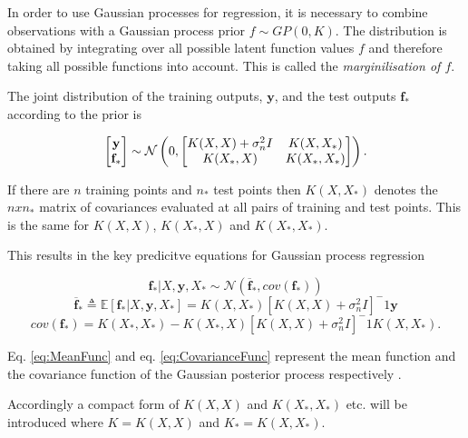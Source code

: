 \documentclass[12pt,a4paper]{report}
\theoremstyle{definition}
\begin{document}
In order to use Gaussian processes for regression, it is necessary to combine observations with a Gaussian process prior $f \sim GP(0, K)$. 
The distribution is obtained by integrating over all possible latent function values $f$ and therefore taking all possible functions into account. This is called the \emph{marginilisation of $f$}. 

The joint distribution of the training outputs, $\textbf{y}$, and the test outputs $\textbf{f}_{*}$ according to the prior is 

\begin{equation}
	\centering
	\begin{bmatrix}
		\textbf{y} \\
		\textbf{f}_{*}
	\end{bmatrix}
	\sim \mathcal{N} \left( 0,
	\begin{bmatrix}
		K(X, X) + \sigma_{n}^2I & K(X, X_{*}) \\
		K(X_{*},  X) & K(X_{*},  X_{*})
	\end{bmatrix} \right) .
	\label{eq:JointPriorDist}
\end{equation}

If there are $n$ training points and $n_{*}$ test points then $K(X, X_{*})$ denotes the $n x n_{*}$ matrix of covariances evaluated at all pairs of training and test points. 
This is the same for $K(X, X)$, $K(X_{*},  X)$ and $K(X_{*},  X_{*})$.

This results in the key predicitve equations for Gaussian process regression

\begin{equation}
	\textbf{f}_{*} | X, \textbf{y}, X_{*} \sim \mathcal{N}(\overline{\textbf{f}}_{*}, cov(\textbf{f}_{*}))
\end{equation}
\begin{equation}
	\overline{\textbf{f}}_{*} \triangleq \mathbb{E}[\textbf{f}_{*} | X, \textbf{y}, X_{*}] = K(X, X_{*})[K(X, X) +  \sigma_{n}^2I]^-1 \textbf{y}
	\label{eq:MeanFunc}
\end{equation}
\begin{equation}
	cov(\textbf{f}_{*}) = K(X_{*}, X_{*}) - K(X_{*}, X)[K(X, X) +  \sigma_{n}^2I]^-1 K(X, X_{*}).
	\label{eq:CovarianceFunc}
\end{equation}

Eq. \ref{eq:MeanFunc} and eq. \ref{eq:CovarianceFunc} represent the mean function and the covariance function of the Gaussian posterior process respectively \citep{RasmussenWilliams2006}. 

Accordingly a compact form of $K(X, X)$ and $K(X_{*}, X_{*})$ etc. will be introduced where $K = K(X, X)$ and $K_{*} = K(X, X_{*})$.
\end{document}
